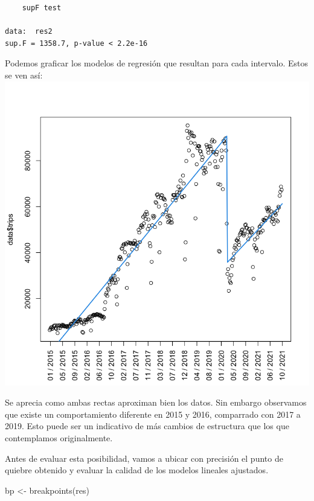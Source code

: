 \documentclass[
]{article}
\newenvironment{Shaded}{}{}
\newcommand{\FunctionTok}[1]{\textcolor[rgb]{0.02,0.16,0.49}{#1}}
\newcommand{\NormalTok}[1]{#1}
\newcommand{\OtherTok}[1]{\textcolor[rgb]{0.00,0.44,0.13}{#1}}
\newcommand{\SpecialCharTok}[1]{\textcolor[rgb]{0.25,0.44,0.63}{#1}}
\begin{document}
\begin{verbatim}
	supF test

data:  res2
sup.F = 1358.7, p-value < 2.2e-16
\end{verbatim}

Podemos graficar los modelos de regresión que resultan para cada
intervalo. Estos se ven así:\\
\includegraphics{../plots/structChange_files/structChange_15_0.png}

Se aprecia como ambas rectas aproximan bien los datos. Sin embargo
observamos que existe un comportamiento diferente en 2015 y 2016,
comparrado con 2017 a 2019. Esto puede ser un indicativo de más cambios
de estructura que los que contemplamos originalmente.

Antes de evaluar esta posibilidad, vamos a ubicar con precisión el punto
de quiebre obtenido y evaluar la calidad de los modelos lineales
ajustados.

\begin{Shaded}
\begin{Highlighting}[]
\NormalTok{bp }\OtherTok{\textless{}{-}} \FunctionTok{breakpoints}\NormalTok{(res)}
\end{Highlighting}
\end{Shaded}

\begin{Shaded}
\end{Shaded}
\end{document}
